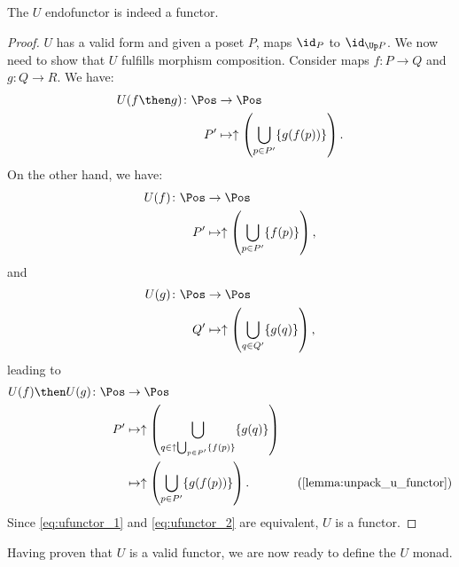 \begin{lemma}
The $U$ endofunctor is indeed a functor.
\end{lemma}
\begin{proof}
$U$ has a valid form and given a poset $P$, maps $\id_P$ to $\id_{\Up P}$. We now need to show that $U$ fulfills morphism composition. Consider maps $f\colon P \to Q$ and $g\colon Q \to R$. We have:
\begin{equation}
\label{eq:ufunctor_1}
\begin{aligned}
U(f\then g)\colon \Pos &\to \Pos\\
P'&\mapsto \uparrow \left( \bigcup_{p\in P'} \{g(f(p))\}\right).
\end{aligned}
\end{equation}
On the other hand, we have:
\begin{equation}
    \begin{aligned}
    U(f)\colon \Pos &\to \Pos\\
    P'&\mapsto \uparrow \left( \bigcup_{p\in P'}\{f(p)\}\right),
    \end{aligned}
\end{equation}
and 
\begin{equation}
    \begin{aligned}
    U(g)\colon \Pos &\to \Pos\\
    Q'&\mapsto \uparrow \left( \bigcup_{q\in Q'}\{g(q)\}\right),
    \end{aligned}
\end{equation}
leading to
\begin{equation}
\label{eq:ufunctor_2}
    \begin{aligned}
    U(f)\then U(g)\colon \Pos &\to \Pos\\
    P'&\mapsto \uparrow\left( \bigcup_{q\in \uparrow \bigcup_{p\in P'}\{f(p)\}}\{g(q)\}\right)\\
    &\mapsto \uparrow \left(\bigcup_{p\in P'} \{ g(f(p))\}\right). \qquad \qquad (\cref{lemma:unpack_u_functor})
    \end{aligned}
\end{equation}
Since \cref{eq:ufunctor_1} and \cref{eq:ufunctor_2} are equivalent, $U$ is a functor.
\end{proof}
Having proven that $U$ is a valid functor, we are now ready to define the $U$ monad.
